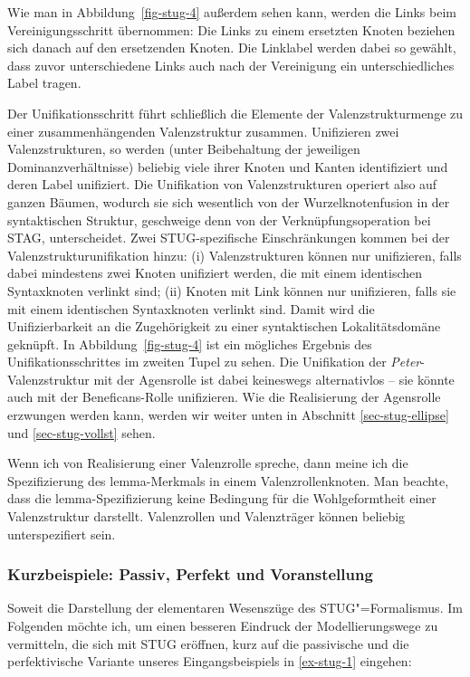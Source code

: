 Wie man in Abbildung~\ref{fig-stug-4} au\ss erdem sehen kann, werden die Links beim Vereinigungsschritt übernommen: Die Links zu einem ersetzten Knoten beziehen sich danach auf den ersetzenden Knoten. Die Linklabel werden dabei so gewählt, dass zuvor unterschiedene Links auch nach der Vereinigung ein unterschiedliches Label tragen. 

Der Unifikationsschritt führt schlie\ss lich die Elemente der Valenzstrukturmenge zu einer zusammenhängenden Valenzstruktur zusammen. Unifizieren zwei Valenzstrukturen, so werden (unter Beibehaltung der jeweiligen Dominanzverhältnisse) beliebig viele ihrer Knoten und Kanten identifiziert und deren Label unifiziert. Die Unifikation von Valenzstrukturen operiert also auf ganzen Bäumen, wodurch sie sich wesentlich von der Wurzelknotenfusion in der syntaktischen Struktur, geschweige denn von der Verknüpfungsoperation bei STAG, unterscheidet. Zwei STUG-spezifische Einschränkungen kommen bei der Valenzstrukturunifikation hinzu: (i) Valenzstrukturen können nur unifizieren, falls dabei mindestens zwei Knoten unifiziert werden, die mit einem identischen Syntaxknoten verlinkt sind; (ii) Knoten mit Link können nur unifizieren, falls sie mit einem identischen Syntaxknoten verlinkt sind. Damit wird die Unifizierbarkeit an die Zugehörigkeit zu einer syntaktischen Lokalitätsdomäne geknüpft. In Abbildung~\ref{fig-stug-4} ist ein mögliches Ergebnis des Unifikationsschrittes im zweiten Tupel zu sehen. Die Unifikation der {\it Peter}-Valenzstruktur mit der Agensrolle ist dabei keineswegs alternativlos -- sie könnte auch mit der Beneficans-Rolle unifizieren. Wie die Realisierung der Agensrolle erzwungen werden kann, werden wir weiter unten in Abschnitt \ref{sec-stug-ellipse} und \ref{sec-stug-vollst} sehen.


\clearpage 

Wenn ich von Realisierung einer Valenzrolle spreche, dann meine ich die Spezifizierung des {\sc lemma}-Merkmals in einem Valenzrollenknoten. Man beachte, dass die {\sc lemma}-Spezifizie\-rung keine Bedingung für die Wohlgeformtheit einer Valenzstruktur darstellt. Valenzrollen und Valenzträger können beliebig unterspezifiert sein.


\subsubsection*{Kurzbeispiele: Passiv, Perfekt und Voranstellung}

Soweit die Darstellung der elementaren Wesenszüge des STUG"=Formalismus. Im Folgenden möchte ich, um einen besseren Eindruck der Modellierungswege zu vermitteln, die sich mit STUG eröffnen, kurz auf die passivische und die perfektivische Variante unseres Eingangsbeispiels in \ref{ex-stug-1} eingehen:


